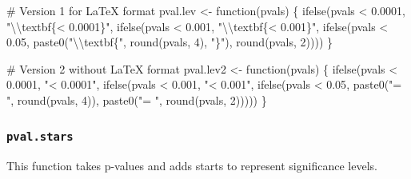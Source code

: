 \documentclass[
  bookmarksnumbered]{article}
\newenvironment{Shaded}{\begin{snugshade}}{\end{snugshade}}
\newcommand{\CommentTok}[1]{\textcolor[rgb]{0.50,0.62,0.50}{#1}}
\newcommand{\ControlFlowTok}[1]{\textcolor[rgb]{0.94,0.87,0.69}{#1}}
\newcommand{\DecValTok}[1]{\textcolor[rgb]{0.86,0.86,0.80}{#1}}
\newcommand{\FloatTok}[1]{\textcolor[rgb]{0.75,0.75,0.82}{#1}}
\newcommand{\FunctionTok}[1]{\textcolor[rgb]{0.94,0.94,0.56}{#1}}
\newcommand{\NormalTok}[1]{\textcolor[rgb]{0.80,0.80,0.80}{#1}}
\newcommand{\OtherTok}[1]{\textcolor[rgb]{0.94,0.94,0.56}{#1}}
\newcommand{\SpecialCharTok}[1]{\textcolor[rgb]{0.86,0.64,0.64}{#1}}
\newcommand{\StringTok}[1]{\textcolor[rgb]{0.80,0.58,0.58}{#1}}
\begin{document}
\begin{Shaded}
\begin{Highlighting}[]
\CommentTok{\# Version 1 for LaTeX format}
\NormalTok{pval.lev }\OtherTok{\textless{}{-}} \ControlFlowTok{function}\NormalTok{(pvals) \{}
  \FunctionTok{ifelse}\NormalTok{(pvals }\SpecialCharTok{\textless{}} \FloatTok{0.0001}\NormalTok{, }\StringTok{"}\SpecialCharTok{\textbackslash{}\textbackslash{}}\StringTok{textbf\{\textless{} 0.0001\}"}\NormalTok{,}
         \FunctionTok{ifelse}\NormalTok{(pvals }\SpecialCharTok{\textless{}} \FloatTok{0.001}\NormalTok{, }\StringTok{"}\SpecialCharTok{\textbackslash{}\textbackslash{}}\StringTok{textbf\{\textless{} 0.001\}"}\NormalTok{,}
                \FunctionTok{ifelse}\NormalTok{(pvals }\SpecialCharTok{\textless{}} \FloatTok{0.05}\NormalTok{, }\FunctionTok{paste0}\NormalTok{(}\StringTok{"}\SpecialCharTok{\textbackslash{}\textbackslash{}}\StringTok{textbf\{"}\NormalTok{, }\FunctionTok{round}\NormalTok{(pvals, }\DecValTok{4}\NormalTok{), }\StringTok{"\}"}\NormalTok{),}
                       \FunctionTok{round}\NormalTok{(pvals, }\DecValTok{2}\NormalTok{))))}
\NormalTok{\}}


\CommentTok{\# Version 2 without LaTeX format}
\NormalTok{pval.lev2 }\OtherTok{\textless{}{-}} \ControlFlowTok{function}\NormalTok{(pvals) \{}
  \FunctionTok{ifelse}\NormalTok{(pvals }\SpecialCharTok{\textless{}} \FloatTok{0.0001}\NormalTok{, }\StringTok{"\textless{} 0.0001"}\NormalTok{,}
         \FunctionTok{ifelse}\NormalTok{(pvals }\SpecialCharTok{\textless{}} \FloatTok{0.001}\NormalTok{, }\StringTok{"\textless{} 0.001"}\NormalTok{,}
                \FunctionTok{ifelse}\NormalTok{(pvals }\SpecialCharTok{\textless{}} \FloatTok{0.05}\NormalTok{, }\FunctionTok{paste0}\NormalTok{(}\StringTok{"= "}\NormalTok{, }\FunctionTok{round}\NormalTok{(pvals, }\DecValTok{4}\NormalTok{)), }
                       \FunctionTok{paste0}\NormalTok{(}\StringTok{"= "}\NormalTok{, }\FunctionTok{round}\NormalTok{(pvals, }\DecValTok{2}\NormalTok{)))))}
\NormalTok{\}}
\end{Highlighting}
\end{Shaded}

\subsubsection{\texorpdfstring{\texttt{pval.stars}}{pval.stars}}\label{pval.stars}

This function takes p-values and adds starts to represent significance levels.
\end{document}
